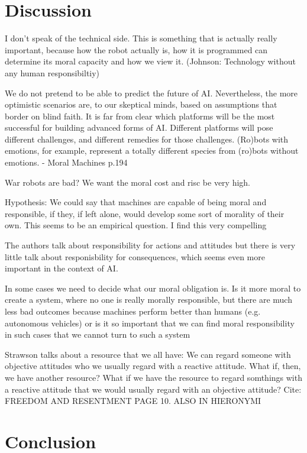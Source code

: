 \documentclass{article}
\newcounter{example}
\begin{document}
\section{Discussion}

I don't speak of the technical side. This is something that is actually really
important, because how the robot actually is, how it is programmed can determine
its moral capacity and how we view it. (Johnson: Technology without any human
responsibiltiy)


We do not pretend to be able to predict the future of AI. Nevertheless, the 
more optimistic scenarios are, to our skeptical minds, based on assumptions 
that border on blind faith. It is far from clear which platforms will be the most 
successful for building advanced forms of AI. Different platforms will pose 
different challenges, and different remedies for those challenges. (Ro)bots 
with emotions, for example, represent a totally different species from (ro)bots 
without emotions. - Moral Machines p.194

War robots are bad? We want the moral cost and risc be very high.

Hypothesis: We could say that machines are capable of being moral and
responsible, if they, if left alone, would develop some sort of morality of
their own. This seems to be an empirical question. I find this very compelling

The authors talk about responsibility for actions and attitudes but there is
very little talk about responisbility for consequences, which seems even more
important in the context of AI.

In some cases we need to decide what our moral obligation is. Is it more moral
to create a system, where no one is really morally responsible, but there are
much less bad outcomes because machines perform better than humans (e.g.
autonomous vehicles) or is it so important that we can find moral responsibility
in such cases that we cannot turn to such a system

Strawson talks about a resource that we all have: We can regard someone with
objective attitudes who we usually regard with a reactive attitude. What if,
then, we have another resource? What if we have the resource to regard somthings
with a reactive attitude that we would usually regard with an objective
attitude? Cite: FREEDOM AND RESENTMENT PAGE 10. ALSO IN HIERONYMI
\section{Conclusion}
\end{document}
